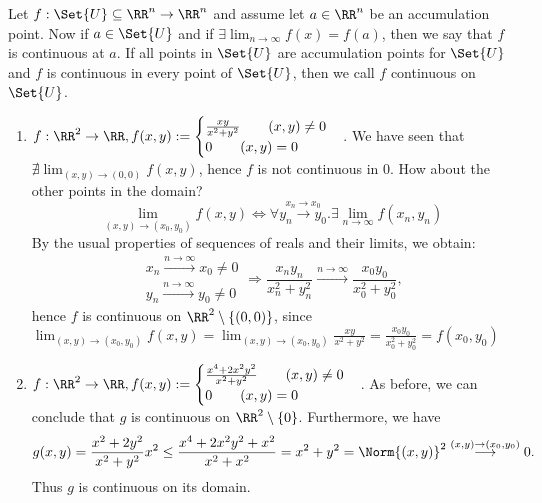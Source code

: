 \begin{defn}
 Let $f:\Set{U}\subseteq\RR^n\to\RR^n$ and assume let $a\in\RR^n$ be an accumulation point. Now if $a\in\Set{U}$ and if $\exists\lim_{n\to\infty}f(x)=f(a)$, then we say that $f$ is continuous at $a$. 
 If all points in $\Set{U}$ are accumulation points for $\Set{U}$ and $f$ is continuous in every point of $\Set{U}$, then we call $f$ continuous on $\Set{U}$. 
\end{defn}
\begin{exam}
 \begin{enumerate}
  \item $f:\RR^2\to\RR, f(x,y):=\begin{cases}\frac{xy}{x^2+y^2}\qquad(x,y)\neq 0\\0\qquad(x,y)=0\end{cases}$. We have seen that $\nexists\lim_{(x,y)\to(0,0)}f(x,y)$, hence $f$ is not continuous in $0$. 
  How about the other points in the domain?
  $$\lim_{(x,y)\to(x_0,y_0)}f(x,y)\Leftrightarrow\forall\overset{x_n\to x_0}{y_n\to y_0}.\exists\lim_{n\to\infty}f(x_n,y_n)$$
  By the usual properties of sequences of reals and their limits, we obtain:
  $$\begin{matrix}x_n\overset{n\to\infty}{\longrightarrow}x_0\neq 0\\y_n\overset{n\to\infty}{\longrightarrow}y_0\neq 0\end{matrix}\Rightarrow\frac{x_ny_n}{x_n^2+y_n^2}\overset{n\to\infty}{\longrightarrow}\frac{x_0y_0}{x_0^2+y_0^2},$$
	  hence $f$ is continuous on $\RR^2\setminus\{(0,0)\}$, since $\lim_{(x,y)\to(x_0,y_0)}f(x,y)=\lim_{(x,y)\to(x_0,y_0)}\frac{xy}{x^2+y^2}=\frac{x_0y_0}{x_0^2+y_0^2}=f(x_0,y_0)$
  \item $f:\RR^2\to\RR, f(x,y):=\begin{cases}\frac{x^4+2x^2y^2}{x^2+y^2}\qquad(x,y)\neq 0\\0\qquad(x,y)=0\end{cases}$. As before, we can conclude that $g$ is continuous on $\RR^2\setminus\{0\}$. Furthermore, we have $$g(x,y)=\frac{x^2+2y^2}{x^2+y^2}x^2\leq \frac{x^4+2x^2y^2+x^2}{x^2+x^2}=x^2+y^2=\Norm{(x,y)}^2\overset{(x,y)\to(x_0,y_0)}{\longrightarrow}0.$$
  Thus $g$ is continuous on its domain.
 \end{enumerate}
\end{exam}
